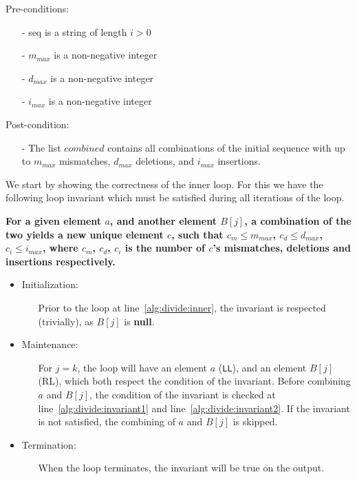 \documentclass[12pt]{article}
\theoremstyle{definition}
\begin{document}
Pre-conditions:
\begin{itemize}
\item[-] seq is a string of length $i > 0$
\item[-] $m_{max}$ is a non-negative integer
\item[-] $d_{max}$ is a non-negative integer
\item[-] $i_{max}$ is a non-negative integer
\end{itemize}

Post-condition:
\begin{itemize}
\item[-] The list $combined$ contains all combinations of the initial sequence with up to  $m_{max}$ mismatches, $d_{max}$ deletions, and $i_{max}$ insertions.
\end{itemize}


We start by showing the correctness of the inner loop. For this we have the following loop invariant which must be satisfied during all iterations of the loop.

\textbf{For a given element $a$, and another element $B[j]$, a combination of the two yields a new unique element $c$, such that $c_m \leq m_{max}$, $c_d \leq d_{max}$, $c_i \leq i_{max}$, where $c_m$, $c_d$, $c_i$ is the number of $c$'s mismatches, deletions and insertions respectively.}

\begin{itemize}
\item Initialization:
\begin{itemize}
	\item[] Prior to the loop at line~\ref{alg:divide:inner}, the invariant is respected (trivially), as $B[j]$ is \textbf{null}.
\end{itemize}

\item Maintenance:
\begin{itemize}
	\item[] For $j = k$, the loop will have an element $a$ (\texttt{LL}), and an element $B[j]$ (RL), which both respect the condition of the invariant. Before combining $a$ and $B[j]$, the condition of the invariant is checked at line~\ref{alg:divide:invariant1} and line~\ref{alg:divide:invariant2}. If the invariant is not satisfied, the combining of $a$ and $B[j]$ is skipped.
\end{itemize}

\item Termination:
\begin{itemize}
	\item[] When the loop terminates, the invariant will be true on the output.
\end{itemize}
\end{itemize}
\end{document}
